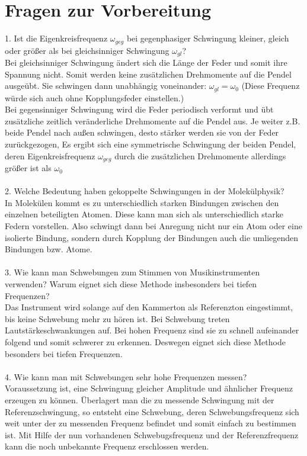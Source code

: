 \section{Fragen zur Vorbereitung}
1. Ist die Eigenkreisfrequenz
$\omega_{geg}$ bei gegenphasiger Schwingung kleiner, gleich oder größer als bei gleichsinniger Schwingung  $\omega_{gl}$?\\
Bei gleichsinniger Schwingung ändert sich die Länge der Feder und somit ihre Spannung nicht. Somit werden keine zusätzlichen Drehmomente auf die Pendel ausgeübt. Sie schwingen dann unabhängig voneinander: $ \omega_{gl}=\omega_{0}$ (Diese Frequenz würde sich auch ohne Kopplungsfeder einstellen.) \\
Bei gegensinniger Schwingung wird die Feder periodisch verformt und übt zusätzliche zeitlich veränderliche Drehmomente auf die Pendel aus. Je weiter z.B. beide Pendel nach außen schwingen, desto stärker werden sie von der Feder zurückgezogen, Es ergibt sich eine symmetrische Schwingung der beiden Pendel, deren Eigenkreisfrequenz  $\omega_{geg}$ durch die zusätzlichen Drehmomente allerdings größer ist als $\omega_{0}$\\
\\2. Welche Bedeutung haben gekoppelte Schwingungen in der Molekülphysik?\\
In Molekülen kommt es zu unterschiedlich starken Bindungen  zwischen den einzelnen beteiligten Atomen. Diese kann man sich als unterschiedlich starke Federn vorstellen. Also schwingt dann bei Anregung nicht nur ein Atom oder eine isolierte Bindung, sondern durch Kopplung der Bindungen auch die umliegenden Bindungen bzw. Atome.\\
\\3. Wie kann man Schwebungen zum Stimmen von Musikinstrumenten verwenden? Warum eignet sich diese Methode insbesonders bei tiefen Frequenzen?\\
Das Instrument wird solange auf den Kammerton als Referenzton eingestimmt, bis keine Schwebung mehr zu hören ist. Bei Schwebung treten Lautstärkeschwankungen auf. Bei hohen Frequenz sind sie zu schnell aufeinander folgend und somit schwerer zu erkennen. Deswegen eignet sich diese Methode besonders bei tiefen Frequenzen.\\
\\4. Wie kann man mit Schwebungen sehr hohe Frequenzen messen?\\
Voraussetzung ist, eine Schwingung gleicher Amplitude und ähnlicher Frequenz erzeugen zu können. Überlagert man die zu messende Schwingung mit der Referenzschwingung, so entsteht eine Schwebung, deren Schwebungsfrequenz sich weit unter der zu messenden Frequenz befindet und somit einfach zu bestimmen ist. Mit Hilfe der nun vorhandenen Schwebugsfrequenz und der Referenzfrequenz kann die noch unbekannte Frequenz erschlossen werden.\\
